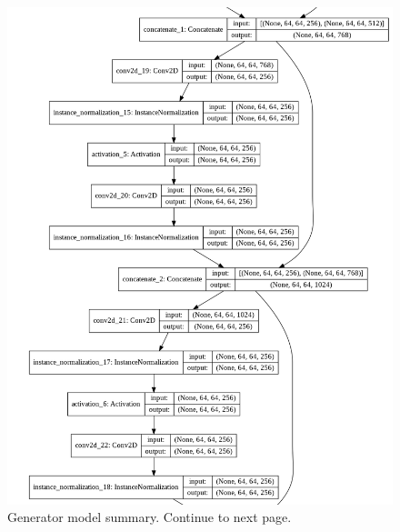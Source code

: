 \begin{figure}[H]
        \vspace*{3cm}
	    \begin{center} 
	    \includegraphics[scale=0.40]{images/Appendix/generator_3.png}
	    \caption{Generator model summary. Continue to next page.}
	    \end{center}
\end{figure}

